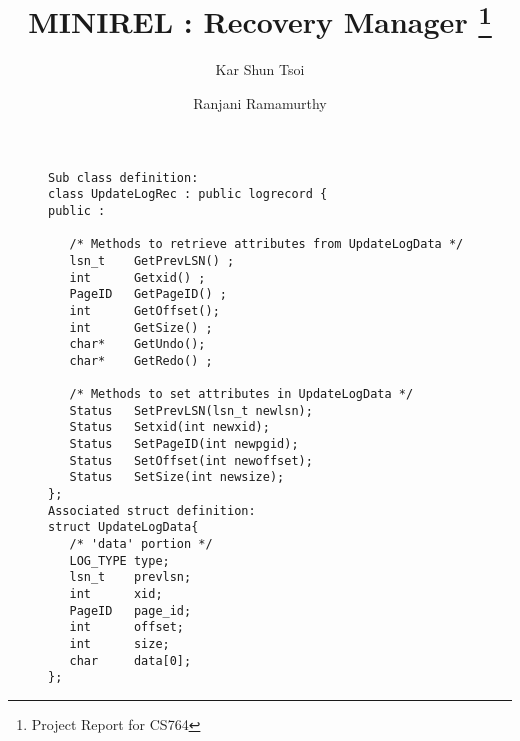 \batchmode
{}
\makeatletter


\newcommand{\dfrac}[2]{{\displaystyle \frac{#1}{#2}}}
\newcommand{\declareref}[2]{\newcounter{#1}\setcounter{#1}{\value{#2}}}
\newcommand{\notaskip}{1.2\baselineskip}

\title{\LARGE MINIREL : Recovery Manager
\thanks{Project Report for CS764}
}

\author{Kar Shun Tsoi \and Ranjani Ramamurthy }







\newcommand{\etalchar}[1]{$^{#1}$}

\makeatother
\newenvironment{tex2html_wrap}{}{}

\pagestyle{empty}
\newpage

{\samepage \clearpage \begin{figure}\centerline{}
 
\label{fig:interaction}
\end{figure}
}


\newpage

{\samepage \clearpage \begin{figure}\centerline{}
 
\label{fig:logdata}
\end{figure}
}


\newpage

{\samepage \clearpage \begin{figure} \label{fig:updclass}
\begin{verbatim}Sub class definition:
class UpdateLogRec : public logrecord {
public :

   /* Methods to retrieve attributes from UpdateLogData */
   lsn_t    GetPrevLSN() ; 
   int      Getxid() ;
   PageID   GetPageID() ;
   int      GetOffset();
   int      GetSize() ;
   char*    GetUndo();
   char*    GetRedo() ;

   /* Methods to set attributes in UpdateLogData */
   Status   SetPrevLSN(lsn_t newlsn);
   Status   Setxid(int newxid);
   Status   SetPageID(int newpgid);
   Status   SetOffset(int newoffset);
   Status   SetSize(int newsize);
};
Associated struct definition:
struct UpdateLogData{
   /* 'data' portion */
   LOG_TYPE type;
   lsn_t    prevlsn;
   int      xid;
   PageID   page_id; 
   int      offset;
   int      size;
   char     data[0];
};\end{verbatim}
\end{figure}
}


